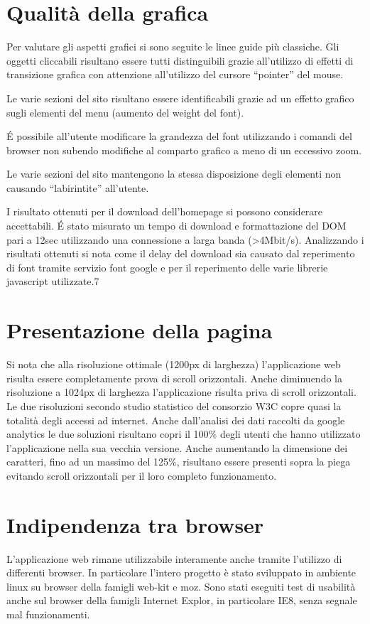 \documentclass[a4paper,12pt,hidelinks]{report}
\begin{document}
\section*{Qualità della grafica}
Per valutare gli aspetti grafici si sono seguite le linee guide più classiche.
Gli oggetti cliccabili risultano essere tutti distinguibili grazie all'utilizzo di effetti di transizione grafica con attenzione all'utilizzo del cursore ``pointer'' del mouse.
\par Le varie sezioni del sito risultano essere identificabili grazie ad un effetto grafico sugli elementi del menu (aumento del weight del font).
\par \'E possibile all'utente modificare la grandezza del font utilizzando i comandi del browser non subendo modifiche al comparto grafico a meno di un eccessivo zoom.
\par Le varie sezioni del sito mantengono la stessa disposizione degli elementi non causando ``labirintite'' all'utente.
\par I risultato ottenuti per il download dell'homepage si possono considerare accettabili. \'E stato misurato un tempo di download e formattazione del DOM pari a 12sec utilizzando
una connessione a larga banda (>4Mbit/s). Analizzando i risultati ottenuti si nota come il delay del download sia causato dal reperimento di font tramite servizio font google e per il 
reperimento delle varie librerie javascript utilizzate.7

\section*{Presentazione della pagina}
Si nota che alla risoluzione ottimale (1200px di larghezza) l'applicazione web risulta essere completamente prova di scroll orizzontali.
Anche diminuendo la risoluzione a 1024px di larghezza l'applicazione risulta priva di scroll orizzontali. Le due risoluzioni secondo studio statistico del consorzio W3C 
copre quasi la totalità degli accessi ad internet. Anche dall'analisi dei dati raccolti da google analytics le due soluzioni risultano copri il 100\% degli utenti che hanno
utilizzato l'applicazione nella sua vecchia versione.
Anche aumentando la dimensione dei caratteri, fino ad un massimo del 125\%, risultano essere presenti sopra la piega evitando scroll orizzontali per il loro completo funzionamento.
\newpage
\section*{Indipendenza tra browser}
L'applicazione web rimane utilizzabile interamente anche tramite l'utilizzo di differenti browser. In particolare l'intero progetto è stato sviluppato in ambiente linux su browser
della famigli web-kit e moz. Sono stati eseguiti test di usabilità anche sul browser della famigli Internet Explor, in particolare IE8, senza segnale mal funzionamenti.
\end{document}
